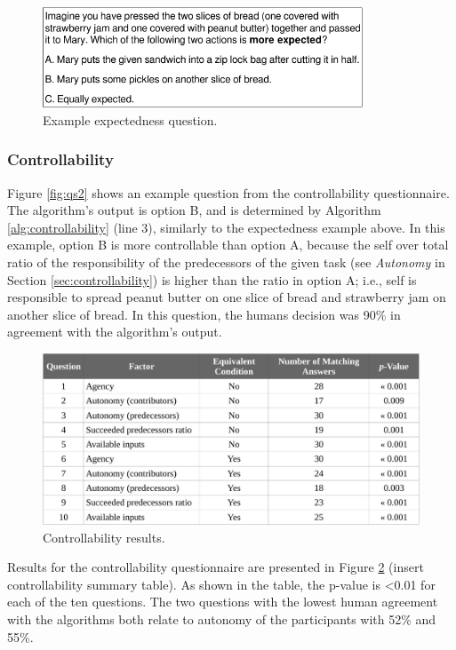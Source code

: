 \documentclass[12pt]{report}
\begin{document}
\begin{figure}[tbh]
  \centering
  \includegraphics[width=0.85\textwidth]{figure/question-sample-croped.pdf}
  \caption{{Example expectedness question.}}
  \label{fig:qs1}
\end{figure}

\subsubsection{Controllability}
\label{sec:controllability-crowdsourcing}
Figure \ref{fig:qs2} shows an example question from the controllability
questionnaire. The algorithm's output is option B, and is determined by
Algorithm \ref{alg:controllability} (line 3), similarly to the expectedness
example above. In this example, option B is more controllable than option A,
because the self over total ratio of the responsibility of the predecessors of
the given task (see \textit{Autonomy} in Section \ref{sec:controllability}) is
higher than the ratio in option A; i.e., self is responsible to spread peanut
butter on one slice of bread and strawberry jam on another slice of bread. In
this question, the humans decision was 90\% in agreement with the algorithm's
output.

\begin{figure}[tbh]
  \centering
  \includegraphics[width=1\textwidth]{figure/controllability_result_croped.pdf}
  \caption{Controllability results.}
  \label{fig:controllability_result}
\end{figure}

Results for the controllability questionnaire are presented in Figure
\ref{fig:controllability_result} (insert controllability summary table). As
shown in the table, the p-value is <0.01 for each of the ten questions. The two
questions with the lowest human agreement with the algorithms both relate to
autonomy of the participants with 52\% and 55\%. 
\end{document}
